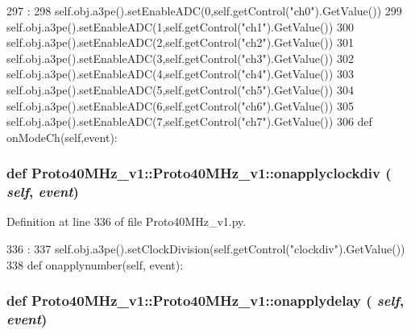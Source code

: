 \begin{DoxyCode}
297                               :
298         self.obj.a3pe().setEnableADC(0,self.getControl("ch0").GetValue())
299         self.obj.a3pe().setEnableADC(1,self.getControl("ch1").GetValue())
300         self.obj.a3pe().setEnableADC(2,self.getControl("ch2").GetValue())
301         self.obj.a3pe().setEnableADC(3,self.getControl("ch3").GetValue())
302         self.obj.a3pe().setEnableADC(4,self.getControl("ch4").GetValue())
303         self.obj.a3pe().setEnableADC(5,self.getControl("ch5").GetValue())
304         self.obj.a3pe().setEnableADC(6,self.getControl("ch6").GetValue())
305         self.obj.a3pe().setEnableADC(7,self.getControl("ch7").GetValue())
306         
    def onModeCh(self,event):
\end{DoxyCode}
\hypertarget{classProto40MHz__v1_1_1Proto40MHz__v1_a918662ec8ceacb6cd21839b01ac9f4d6}{
\subsubsection[{onapplyclockdiv}]{\setlength{\rightskip}{0pt plus 5cm}def Proto40MHz\_\-v1::Proto40MHz\_\-v1::onapplyclockdiv ( {\em self}, \/   {\em event})}}
\label{classProto40MHz__v1_1_1Proto40MHz__v1_a918662ec8ceacb6cd21839b01ac9f4d6}


Definition at line 336 of file Proto40MHz\_\-v1.py.


\begin{DoxyCode}
336                                     :
337         self.obj.a3pe().setClockDivision(self.getControl("clockdiv").GetValue())
338 
    def onapplynumber(self, event):
\end{DoxyCode}
\hypertarget{classProto40MHz__v1_1_1Proto40MHz__v1_af6d9fb7379dbfca84e6bf66e09396d35}{
\subsubsection[{onapplydelay}]{\setlength{\rightskip}{0pt plus 5cm}def Proto40MHz\_\-v1::Proto40MHz\_\-v1::onapplydelay ( {\em self}, \/   {\em event})}}
\label{classProto40MHz__v1_1_1Proto40MHz__v1_af6d9fb7379dbfca84e6bf66e09396d35}


